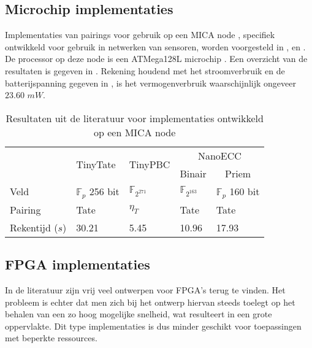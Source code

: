\subsection{Microchip implementaties}

Implementaties van pairings voor gebruik op een MICA node \cite{mica}, specifiek ontwikkeld voor gebruik in netwerken van sensoren, worden voorgesteld in \cite{tinytate}, \cite{tinypbc} en \cite{nanoecc}. De processor op deze node is een ATMega128L microchip \cite{atmega}. Een overzicht van de resultaten is gegeven in . Rekening houdend met het stroomverbruik en de batterijspanning gegeven in \cite{nanoecc}, is het vermogenverbruik waarschijnlijk ongeveer $23.60$ $mW$.

\begin{table}[h]
	\caption[Resultaten uit de literatuur voor implementaties ontwikkeld op een MICA node]{Resultaten uit de literatuur voor implementaties ontwikkeld op een MICA node \cite{mica}}
	\label{tabel-resultaten-sensor}

	\centering
	\begin{tabular}{lllll}
		\toprule
		& \multirow{2}{*}{TinyTate \cite{tinytate}}	& \multirow{2}{*}{TinyPBC \cite{tinypbc}} &	\multicolumn{2}{c}{NanoECC \cite{nanoecc}}\\
		\cmidrule{4-5}
		& & & \multicolumn{1}{c}{Binair} & \multicolumn{1}{c}{Priem}\\
			\midrule
		Veld					& $\mathbb{F}_{p}$ 256 bit	& $\mathbb{F}_{2^{271}}$	& $\mathbb{F}_{2^{163}}$	& $\mathbb{F}_{p}$ 160 bit\\
		Pairing				& Tate							& $\eta_T$ 						& Tate							& Tate\\
		Rekentijd ($s$)	& 30.21							& 5.45							& 10.96							& 17.93\\
		\bottomrule
	\end{tabular}
\end{table}

\subsection{FPGA implementaties}

In de literatuur zijn vrij veel ontwerpen voor FPGA's terug te vinden. Het probleem is echter dat men zich bij het ontwerp hiervan steeds toelegt op het behalen van een zo hoog mogelijke snelheid, wat resulteert in een grote oppervlakte. Dit type implementaties is dus minder geschikt voor toepassingen met beperkte ressources.


